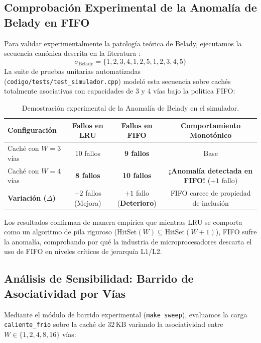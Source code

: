 \documentclass[11pt,letterpaper]{article}
\begin{document}
\subsection{Comprobación Experimental de la Anomalía de Belady en FIFO}
Para validar experimentalmente la patología teórica de Belady, ejecutamos la secuencia canónica descrita en la literatura \cite{belady1966study}:
\begin{equation}
    \sigma_{\text{Belady}} = \{1, 2, 3, 4, 1, 2, 5, 1, 2, 3, 4, 5\}
\end{equation}
La suite de pruebas unitarias automatizadas (\texttt{codigo/tests/test\_simulador.cpp}) modeló esta secuencia sobre cachés totalmente asociativas con capacidades de 3 y 4 vías bajo la política FIFO:

\begin{table}[htbp]
\centering
\caption{Demostración experimental de la Anomalía de Belady en el simulador.}
\label{tab:belady}
\begin{tabular}{lccc}
\toprule
\textbf{Configuración} & \textbf{Fallos en LRU} & \textbf{Fallos en FIFO} & \textbf{Comportamiento Monotónico} \\
\midrule
Caché con $W = 3$ vías & 10 fallos & \textbf{9 fallos} & Base \\
Caché con $W = 4$ vías & \textbf{8 fallos} & \textbf{10 fallos} & \textbf{¡Anomalía detectada en FIFO!} ($+1$ fallo) \\
\midrule
\textbf{Variación ($\Delta$)} & $-2$ fallos (Mejora) & $+1$ fallo (\textbf{Deterioro}) & FIFO carece de propiedad de inclusión \\
\bottomrule
\end{tabular}
\end{table}

\noindent Los resultados confirman de manera empírica que mientras LRU se comporta como un algoritmo de pila riguroso ($\text{HitSet}(W) \subseteq \text{HitSet}(W+1)$), FIFO sufre la anomalía, comprobando por qué la industria de microprocesadores descarta el uso de FIFO en niveles críticos de jerarquía L1/L2.

\subsection{Análisis de Sensibilidad: Barrido de Asociatividad por Vías}
Mediante el módulo de barrido experimental (\texttt{make sweep}), evaluamos la carga \texttt{caliente\_frio} sobre la caché de $32\,\text{KB}$ variando la asociatividad entre $W \in \{1, 2, 4, 8, 16\}$ vías:
\end{document}
